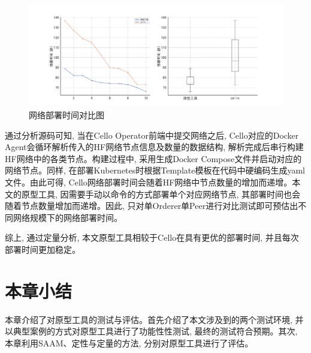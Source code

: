 \begin{figure}[h] %
    \centering %
    \includegraphics[width=1.0\textwidth]{FIGs/chapter5/plt_deployment.png} %
    \caption{网络部署时间对比图} %
    \label{plt_deployment} %
\end{figure}%

通过分析源码\footnotemark[1]可知, 当在Cello Operator前端中提交网络之后, Cello对应的Docker Agent会循环解析传入的HF网络节点信息及数量的数据结构, 解析完成后串行构建HF网络中的各类节点。构建过程中, 采用生成Docker Compose文件并启动对应的网络节点。同样, 在部署Kubernetes时根据Template模板在代码中硬编码生成yaml文件。由此可得, Cello网络部署时间会随着HF网络中节点数量的增加而递增。本文的原型工具, 因需要手动以命令的方式部署单个对应网络节点, 其部署时间也会随着节点数量增加而递增。因此, 只对单Orderer单Peer进行对比测试即可预估出不同网络规模下的网络部署时间。

综上, 通过定量分析, 本文原型工具相较于Cello在具有更优的部署时间, 并且每次部署时间更加稳定。


\section{本章小结}

本章介绍了对原型工具的测试与评估。首先介绍了本文涉及到的两个测试环境, 并以典型案例的方式对原型工具进行了功能性性测试, 最终的测试符合预期。其次, 本章利用SAAM、定性与定量的方法, 分别对原型工具进行了评估。

